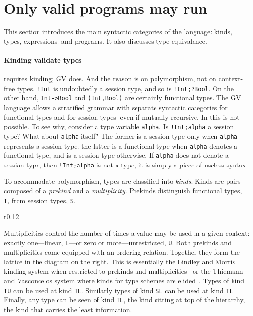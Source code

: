 \section{Only valid programs may run}
\label{sec:valid}

This section introduces the main syntactic categories of the language:
kinds, types, expressions, and programs. It also discusses type
equivalence.

\paragraph{Kinding validate types}

\freest{} requires kinding; GV does. And the reason is on
polymorphism, not on context-free types.
%
\lstinline|!Int| is undoubtedly a session type, and so is
\lstinline|!Int;?Bool|. On the other hand, \lstinline|Int->Bool| and
\lstinline|(Int,Bool)| are certainly functional types. The GV language
allows a stratified grammar with separate syntactic categories for
functional types and for session types, even if mutually recursive.
%
In \freest{} this is not possible.  To see why, consider a type
variable \lstinline|alpha|. Is \lstinline|!Int;alpha| a session type?
What about \lstinline|alpha| itself? The former is a session type only
when \lstinline|alpha| represents a session type; the latter is a
functional type when \lstinline|alpha| denotes a functional type, and
is a session type otherwise. If \lstinline|alpha| does not denote a
session type, then \lstinline|!Int;alpha| is not a type, it is simply
a piece of useless syntax.

To accommodate polymorphism, types are classified into \emph{kinds}.
%
Kinds are pairs composed of a \emph{prekind} and a
\emph{multiplicity}. Prekinds distinguish functional types,
\lstinline|T|, from session types, \lstinline|S|.
%
\begin{wrapfigure}{r}{0.12\textwidth}
\end{wrapfigure}
%
Multiplicities control the number of times a value may be used in a
given context: exactly one---linear, \lstinline|L|---or zero or
more---unrestricted, \lstinline|U|. Both prekinds and multiplicities
come equipped with an ordering relation. Together they form the
lattice in the diagram on the right.
%
This is essentially the Lindley and Morris kinding system when
restricted to prekinds and
multiplicities~\cite{Lindley.Morris_Lightweight.functional.session.types}
or the Thiemann and Vasconcelos system where kinds for type schemes
are elided~\cite{DBLP:conf/icfp/ThiemannV16}.
%
Types of kind \lstinline|TU| can be used at kind
\lstinline|TL|. Similarly
types of kind \lstinline|SL| can be used at
kind \lstinline|TL|.  Finally, any type can be seen of kind
\lstinline|TL|, the kind sitting at top of the hierarchy, the kind
that carries the least information.

